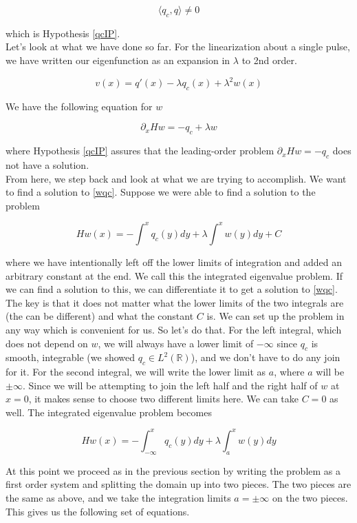 \documentclass[12pt]{article}
\def\R{{\mathbb R}}
\begin{document}
\[
\langle q_c, q \rangle \neq 0
\]

which is Hypothesis \ref{qcIP}.\\

Let's look at what we have done so far. For the linearization about a single pulse, we have written our eigenfunction as an expansion in $\lambda$ to 2nd order.

\begin{equation}\label{eigenfntosecondorder}
v(x) = q'(x) - \lambda q_c(x) + \lambda^2 w(x)
\end{equation}

We have the following equation for $w$

\begin{equation}\label{wqc}
\partial_x H w = -q_c + \lambda w 
\end{equation}

where Hypothesis \ref{qcIP} assures that the leading-order problem $\partial_x H w = -q_c$ does not have a solution.\\

From here, we step back and look at what we are trying to accomplish. We want to find a solution to \eqref{wqc}. Suppose we were able to find a solution to the problem

\[
H w(x) = -\int^x q_c(y) dy + \lambda \int^x w(y) dy + C
\]

where we have intentionally left off the lower limits of integration and added an arbitrary constant at the end. We call this the integrated eigenvalue problem. If we can find a solution to this, we can differentiate it to get a solution to \eqref{wqc}. The key is that it does not matter what the lower limits of the two integrals are (the can be different) and what the constant $C$ is. We can set up the problem in any way which is convenient for us. So let's do that. For the left integral, which does not depend on $w$, we will always have a lower limit of $-\infty$ since $q_c$ is smooth, integrable (we showed $q_c \in L^2(\R)$), and we don't have to do any join for it. For the second integral, we will write the lower limit as $a$, where $a$ will be $\pm \infty$. Since we will be attempting to join the left half and the right half of $w$ at $x = 0$, it makes sense to choose two different limits here. We can take $C = 0$ as well. The integrated eigenvalue problem becomes
 
\[
H w(x) = -\int_{-\infty}^x q_c(y) dy + \lambda \int_a^x w(y) dy 
\]

At this point we proceed as in the previous section by writing the problem as a first order system and splitting the domain up into two pieces. The two pieces are the same as above, and we take the integration limits $a = \pm \infty$ on the two pieces. This gives us the following set of equations.
\end{document}
